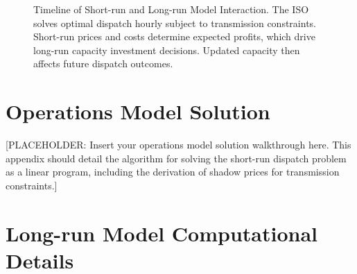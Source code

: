 \documentclass[12pt]{article}
\begin{document}
\begin{figure}
\caption{Timeline of Short-run and Long-run Model Interaction. The ISO solves optimal dispatch hourly subject to transmission constraints. Short-run prices and costs determine expected profits, which drive long-run capacity investment decisions. Updated capacity then affects future dispatch outcomes.}
\label{fig:ModelTimeline}
\end{figure}






\clearpage

\appendix

\section{Operations Model Solution} \label{sec:appendixa}

[PLACEHOLDER: Insert your operations model solution walkthrough here. This appendix should detail the algorithm for solving the short-run dispatch problem as a linear program, including the derivation of shadow prices for transmission constraints.]

\section{Long-run Model Computational Details} \label{sec:appendixb}
\end{document}

